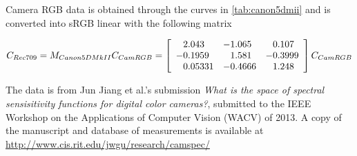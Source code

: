 Camera \gls{RGB} data is obtained through the curves in
\cref{tab:canon5dmii} and is converted into
\gls{sRGB} linear with the following matrix

\begin{displaymath}
C_{Rec709} = M_{Canon5DMkII} C_{CamRGB} = \left[\begin{array}{r@{.}lr@{.}lr@{.}l}
 2&043   & -1&065  &  0&107  \\
-0&1959  &  1&581  & -0&3999 \\
 0&05331 & -0&4666 &  1&248  \\
\end{array}\right] C_{CamRGB}
\end{displaymath}

The data is from Jun Jiang et al.'s submission \textit{What is the space of spectral sensisitivity
functions for digital color cameras?}, submitted to the IEEE Workshop on the Applications of Computer
Vision (WACV) of 2013.
A copy of the manuscript and database of measurements is available at 
\url{http://www.cis.rit.edu/jwgu/research/camspec/}

